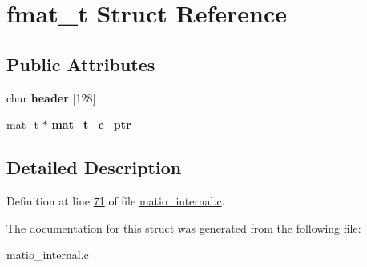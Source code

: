 \hypertarget{structfmat__t}{}\section{fmat\+\_\+t Struct Reference}
\label{structfmat__t}
\subsection*{Public Attributes}
\begin{DoxyCompactItemize}
\item 
\mbox{\label{structfmat__t_a7ac2e11c54cdc6d2008c11100fe4b518}} 
char {\bfseries header} \mbox{[}128\mbox{]}
\item 
\mbox{\label{structfmat__t_a79999c78b5a1525a8f1e09a9b50d3f58}} 
\hyperlink{group___m_a_t_gab0fc888f5a5d79943b16284b1f91c2e8}{mat\+\_\+t} $\ast$ {\bfseries mat\+\_\+t\+\_\+c\+\_\+ptr}
\end{DoxyCompactItemize}


\subsection{Detailed Description}


Definition at line \hyperlink{matio__internal_8c_source_l00071}{71} of file \hyperlink{matio__internal_8c_source}{matio\+\_\+internal.\+c}.



The documentation for this struct was generated from the following file\+:\begin{DoxyCompactItemize}
\item 
matio\+\_\+internal.\+c\end{DoxyCompactItemize}
